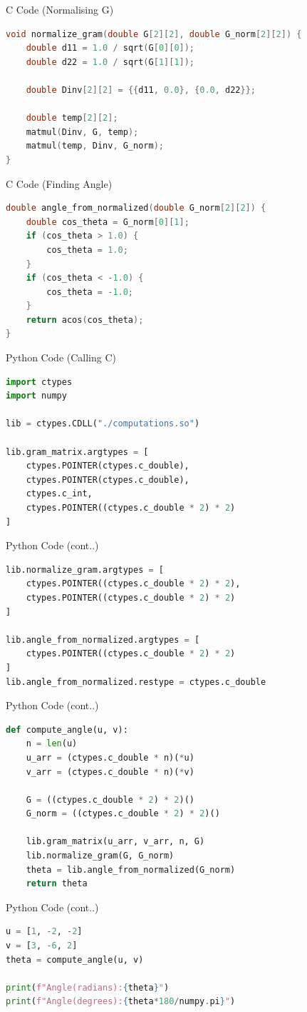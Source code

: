 \documentclass{beamer}
\begin{document}
\begin{frame}[fragile]{C Code (Normalising G)}
\begin{lstlisting}[language=C]
void normalize_gram(double G[2][2], double G_norm[2][2]) {
    double d11 = 1.0 / sqrt(G[0][0]);
    double d22 = 1.0 / sqrt(G[1][1]);

    double Dinv[2][2] = {{d11, 0.0}, {0.0, d22}};

    double temp[2][2];
    matmul(Dinv, G, temp); 
    matmul(temp, Dinv, G_norm);
}
\end{lstlisting}
\end{frame}

\begin{frame}[fragile]{C Code (Finding Angle)}
\begin{lstlisting}[language=C]
double angle_from_normalized(double G_norm[2][2]) {
    double cos_theta = G_norm[0][1]; 
    if (cos_theta > 1.0) {
        cos_theta = 1.0; 
    }
    if (cos_theta < -1.0) {
        cos_theta = -1.0;
    }
    return acos(cos_theta);
}
\end{lstlisting}
\end{frame}


\begin{frame}[fragile]{Python Code (Calling C)}
\begin{lstlisting}[language=Python]
import ctypes
import numpy

lib = ctypes.CDLL("./computations.so")

lib.gram_matrix.argtypes = [
    ctypes.POINTER(ctypes.c_double),
    ctypes.POINTER(ctypes.c_double),
    ctypes.c_int,
    ctypes.POINTER((ctypes.c_double * 2) * 2)
]
\end{lstlisting}
\end{frame}


\begin{frame}[fragile]{Python Code (cont..)}
\begin{lstlisting}[language=Python]
lib.normalize_gram.argtypes = [
    ctypes.POINTER((ctypes.c_double * 2) * 2),
    ctypes.POINTER((ctypes.c_double * 2) * 2)
]

lib.angle_from_normalized.argtypes = [
    ctypes.POINTER((ctypes.c_double * 2) * 2)
]
lib.angle_from_normalized.restype = ctypes.c_double
\end{lstlisting}
\end{frame}


\begin{frame}[fragile]{Python Code (cont..)}
\begin{lstlisting}[language=Python]
def compute_angle(u, v):
    n = len(u)
    u_arr = (ctypes.c_double * n)(*u)
    v_arr = (ctypes.c_double * n)(*v)

    G = ((ctypes.c_double * 2) * 2)()
    G_norm = ((ctypes.c_double * 2) * 2)()

    lib.gram_matrix(u_arr, v_arr, n, G)
    lib.normalize_gram(G, G_norm)
    theta = lib.angle_from_normalized(G_norm)
    return theta
\end{lstlisting}
\end{frame}


\begin{frame}[fragile]{Python Code (cont..)}
\begin{lstlisting}[language=Python]
u = [1, -2, -2]
v = [3, -6, 2]
theta = compute_angle(u, v)

print(f"Angle(radians):{theta}")
print(f"Angle(degrees):{theta*180/numpy.pi}")
\end{lstlisting}
\end{frame}
\end{document}

